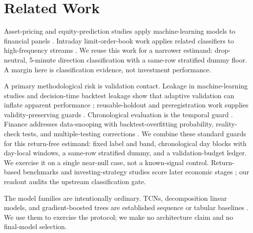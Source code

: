 \section{Related Work}

Asset-pricing and equity-prediction studies apply machine-learning models to
financial panels \cite{gu2020empirical,fischer2018deep}. Intraday
limit-order-book work applies related classifiers to high-frequency streams
\cite{zhang2019deeplob}. We reuse this work for a narrower estimand:
drop-neutral, 5-minute direction classification with a same-row stratified dummy
floor. A \macrofone{} margin here is classification evidence, not investment
performance.

A primary methodological risk is validation contact. Leakage in
machine-learning studies and decision-time backtest leakage show that adaptive
validation can inflate apparent performance
\cite{kapoor2023leakage,zhang2026whenalpha}; reusable-holdout and
preregistration work supplies validity-preserving guards
\cite{dwork2015reusable,hofman2023preregistration}. Chronological evaluation is
the temporal guard \cite{hyndman2021forecasting}. Finance addresses
data-snooping with backtest-overfitting probability, reality-check tests, and
multiple-testing corrections
\cite{lopezdeprado2018advances,bailey2014pseudo,bailey2016probability,harvey2016cross,white2000reality,sullivan1999datasnooping}.
We combine these standard guards for this return-free \macrofone{} estimand:
fixed label and band, chronological day blocks with day-local windows, a
same-row stratified dummy, and a validation-budget ledger. We exercise it on a
single near-null case, not a known-signal control. Return-based benchmarks and
investing-strategy studies score later economic stages
\cite{zhang2026whenalpha,li2026finsaber}; our readout audits the upstream
classification gate.

The model families are intentionally ordinary. TCNs, decomposition linear models,
and gradient-boosted trees are established sequence or tabular baselines
\cite{bai2018empirical,zeng2023dlinear,ke2017lightgbm,grinsztajn2022tree}. We use
them to exercise the protocol; we make no architecture claim and no
final-model selection.

